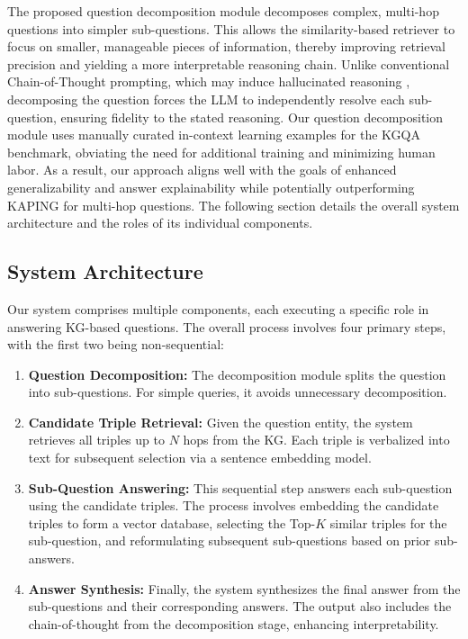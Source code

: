 \documentclass[pdflatex,sn-mathphys-num]{sn-jnl}%
\theoremstyle{thmstyleone}%
\theoremstyle{thmstyletwo}%
\theoremstyle{thmstylethree}%
\begin{document}
The proposed question decomposition module decomposes complex, multi-hop questions into simpler sub-questions. This allows the similarity-based retriever to focus on smaller, manageable pieces of information, thereby improving retrieval precision and yielding a more interpretable reasoning chain. Unlike conventional Chain-of-Thought prompting, which may induce hallucinated reasoning \cite{Radha2023}, decomposing the question forces the LLM to independently resolve each sub-question, ensuring fidelity to the stated reasoning. Our question decomposition module uses manually curated in-context learning examples for the KGQA benchmark, obviating the need for additional training and minimizing human labor. As a result, our approach aligns well with the goals of enhanced generalizability and answer explainability while potentially outperforming KAPING for multi-hop questions. The following section details the overall system architecture and the roles of its individual components.

\subsection{System Architecture}\label{sec:architecture}

Our system comprises multiple components, each executing a specific role in answering KG-based questions. The overall process involves four primary steps, with the first two being non-sequential:

\begin{enumerate}
    \item \textbf{Question Decomposition:} The decomposition module splits the question into sub-questions. For simple queries, it avoids unnecessary decomposition.
    \item \textbf{Candidate Triple Retrieval:} Given the question entity, the system retrieves all triples up to $N$ hops from the KG. Each triple is verbalized into text for subsequent selection via a sentence embedding model.
    \item \textbf{Sub-Question Answering:} This sequential step answers each sub-question using the candidate triples. The process involves embedding the candidate triples to form a vector database, selecting the Top-$K$ similar triples for the sub-question, and reformulating subsequent sub-questions based on prior sub-answers.
    \item \textbf{Answer Synthesis:} Finally, the system synthesizes the final answer from the sub-questions and their corresponding answers. The output also includes the chain-of-thought from the decomposition stage, enhancing interpretability.
\end{enumerate}
\end{document}
